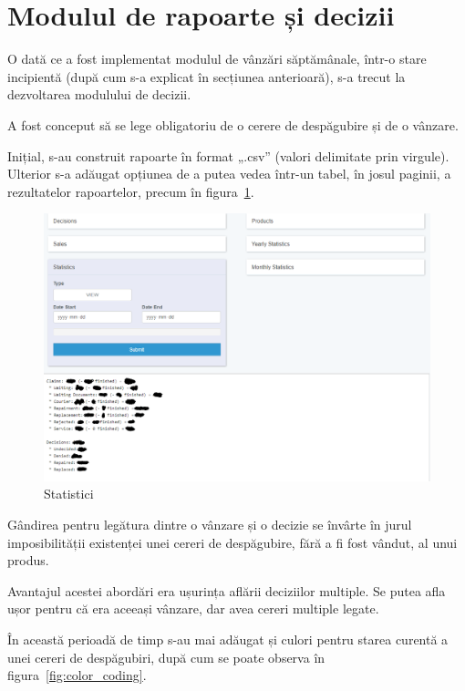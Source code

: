 \section{Modulul de rapoarte și decizii}

	O dată ce a fost implementat modulul de vânzări săptămânale, într-o stare incipientă (după cum s-a explicat în secțiunea anterioară), s-a trecut la dezvoltarea modulului de decizii.

	A fost conceput să se lege obligatoriu de o cerere de despăgubire și de o vânzare.

	Inițial, s-au construit rapoarte în format „.csv” (valori delimitate prin virgule).
	Ulterior s-a adăugat opțiunea de a putea vedea într-un tabel, în josul paginii, a rezultatelor rapoartelor, precum în figura~\ref{fig:statistics}.

	\begin{figure}
		\includegraphics[width=\linewidth]{../imagini/statistics.png}
		\caption{Statistici}
		\label{fig:statistics}
	\end{figure}


	Gândirea pentru legătura dintre o vânzare și o decizie se învârte în jurul imposibilității existenței unei cereri de despăgubire, fără a fi fost vândut, al unui produs.

	Avantajul acestei abordări era ușurința aflării deciziilor multiple.
	Se putea afla ușor pentru că era aceeași vânzare, dar avea cereri multiple legate.

	În această perioadă de timp s-au mai adăugat și culori pentru starea curentă a unei cereri de despăgubiri, după cum se poate observa în figura~\ref{fig:color_coding}.

